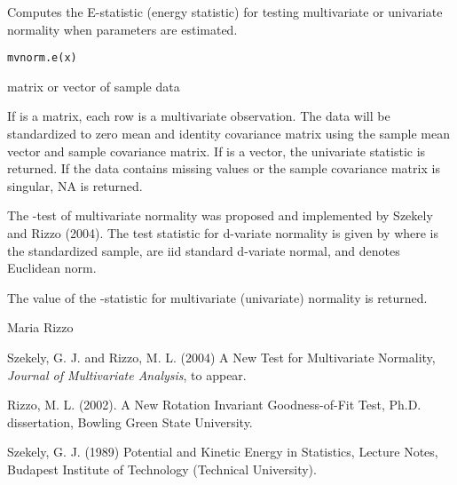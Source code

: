 \documentclass{article}
\begin{document}
\begin{Description}\relax
Computes the E-statistic (energy statistic) for testing multivariate 
or univariate normality when parameters are estimated.
\end{Description}
\begin{Usage}
\begin{verbatim}
mvnorm.e(x)
\end{verbatim}
\end{Usage}
\begin{Arguments}
\begin{ldescription}
\item[\code{x}] matrix or vector of sample data
\end{ldescription}
\end{Arguments}
\begin{Details}\relax
If  is a matrix, each row is a multivariate observation. The
data will be standardized to zero mean and identity covariance matrix
using the sample mean vector and sample covariance matrix. If 
is a vector, the univariate statistic  is returned. 
If the data contains missing values or the sample covariance matrix is 
singular, NA is returned.

The -test of multivariate normality was proposed
and implemented by Szekely and Rizzo (2004). The test statistic for 
d-variate normality is given by
where  is the standardized sample, 
 are iid standard d-variate normal, and
\eqn{\| \cdot \|}{|| ||} denotes Euclidean norm.\end{Details}
\begin{Value}
The value of the -statistic for multivariate
(univariate) normality is returned.\end{Value}
\begin{Author}\relax
Maria Rizzo 
\end{Author}
\begin{References}\relax
Szekely, G. J. and Rizzo, M. L. (2004) A New Test for 
Multivariate Normality, \emph{Journal of Multivariate Analysis},
to appear.

Rizzo, M. L. (2002). A New Rotation Invariant Goodness-of-Fit Test,
Ph.D. dissertation, Bowling Green State University.

Szekely, G. J. (1989) Potential and Kinetic Energy in Statistics, 
Lecture Notes, Budapest Institute of Technology (Technical University).\end{References}
\end{document}

